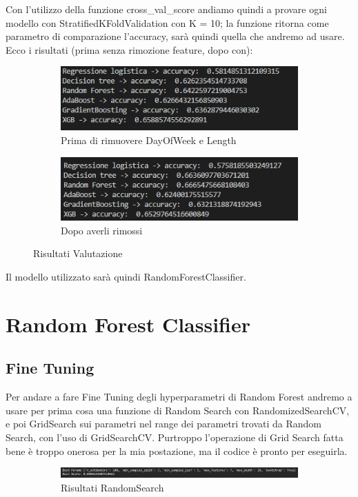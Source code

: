 \documentclass{article}
\begin{document}
Con l'utilizzo della funzione cross\_val\_score andiamo quindi a provare ogni modello con StratifiedKFoldValidation con K = 10; la funzione ritorna come parametro di comparazione l'accuracy, sarà quindi quella che andremo ad usare.
Ecco i risultati (prima senza rimozione feature, dopo con):
\begin{figure}[H]
  \centering
  \begin{subfigure}[b]{0.6\linewidth}
    \includegraphics[width=\linewidth]{BeforeRemovingFeatures}
     \caption{Prima di rimuovere DayOfWeek e Length}
  \end{subfigure}
  \begin{subfigure}[b]{0.6\linewidth}
    \includegraphics[width=\linewidth]{AfterRemovingFeatures}
    \caption{Dopo averli rimossi}
  \end{subfigure}
  \caption{Risultati Valutazione}
  \label{fig:image4}
\end{figure}

Il modello utilizzato sarà quindi RandomForestClassifier.

\section{Random Forest Classifier}
\subsection{Fine Tuning}
Per andare a fare Fine Tuning degli hyperparametri di Random Forest andremo a usare per prima cosa una funzione di Random Search con RandomizedSearchCV, e poi GridSearch sui parametri nel range dei parametri trovati da Random Search, con l'uso di GridSearchCV.
Purtroppo l'operazione di Grid Search fatta bene è troppo onerosa per la mia postazione, ma il codice è pronto per eseguirla. 
\begin{figure}[H]
 \centering
  \begin{subfigure}[b]{1.3\linewidth}
    \includegraphics[width=\linewidth]{RandomSearchResults}
     \caption{Risultati RandomSearch}
  \end{subfigure}
  \caption{}
  \label{fig:image5}
\end{figure}
\end{document}
